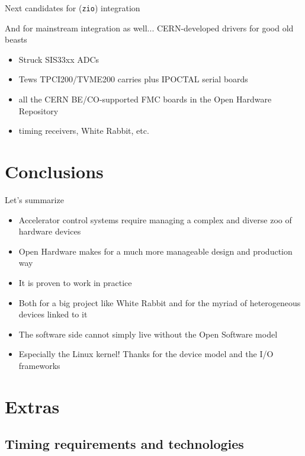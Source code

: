 \documentclass[compress,red]{beamer}
\begin{document}
\begin{frame}{Next candidates for (\texttt{zio}) integration}

And for mainstream integration as well...
\pause
CERN-developed drivers for good old beasts
\begin{itemize}
\pause
\item Struck SIS33xx ADCs
\pause
\item Tews TPCI200/TVME200 carries plus IPOCTAL serial boards
\pause
\item all the CERN BE/CO-supported FMC boards in the Open Hardware Repository
\pause
\item timing receivers, White Rabbit, etc.
\end{itemize}
\end{frame}

\section{Conclusions}

\begin{frame}{Let's summarize}

\begin{itemize}
\pause
\item Accelerator control systems require managing a complex and
    diverse zoo of hardware devices
\pause
\item Open Hardware makes for a much more manageable design and 
    production way
\pause
\item It is proven to work in practice
\pause
\item Both for a big project like White Rabbit and for the myriad
    of heterogeneous devices linked to it
\pause
\item The software side cannot simply live without the Open Software
    model
\pause
\item Especially the Linux kernel! Thanks for the device model and
    the I/O frameworks
\end{itemize}
\end{frame}

\section{Extras}

\subsection {Timing requirements and technologies}
\end{document}
